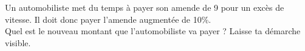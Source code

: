 %
%
    Un automobiliste met du temps à payer son amende de \SI{9}{\sieuro} pour un excès de vitesse. Il doit donc payer l'amende augmentée de 10\%.\\
    Quel est le nouveau montant que l'automobiliste va payer ? Laisse ta démarche visible.\vspace*{3cm}
